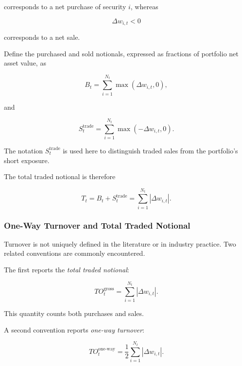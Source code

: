 \documentclass[11pt,a4paper]{article}
\begin{document}
corresponds to a net purchase of security $i$, whereas

\begin{equation}
\Delta w_{i,t}<0
\end{equation}

corresponds to a net sale.

Define the purchased and sold notionals, expressed as fractions of portfolio
net asset value, as

\begin{equation}
B_t
=
\sum_{i=1}^{N_t}
\max(\Delta w_{i,t},0),
\end{equation}

and

\begin{equation}
S_t^{\mathrm{trade}}
=
\sum_{i=1}^{N_t}
\max(-\Delta w_{i,t},0).
\end{equation}

The notation $S_t^{\mathrm{trade}}$ is used here to distinguish traded sales
from the portfolio's short exposure.

The total traded notional is therefore

\begin{equation}
\boxed{
T_t
=
B_t
+
S_t^{\mathrm{trade}}
=
\sum_{i=1}^{N_t}
|\Delta w_{i,t}|.
}
\end{equation}


\subsubsection{One-Way Turnover and Total Traded Notional}

Turnover is not uniquely defined in the literature or in industry practice.
Two related conventions are commonly encountered.

The first reports the \emph{total traded notional}:

\begin{equation}
\boxed{
TO_t^{\mathrm{gross}}
=
\sum_{i=1}^{N_t}
|\Delta w_{i,t}|.
}
\end{equation}

This quantity counts both purchases and sales.

A second convention reports \emph{one-way turnover}:

\begin{equation}
\boxed{
TO_t^{\mathrm{one\text{-}way}}
=
\frac{1}{2}
\sum_{i=1}^{N_t}
|\Delta w_{i,t}|.
}
\end{equation}
\end{document}
